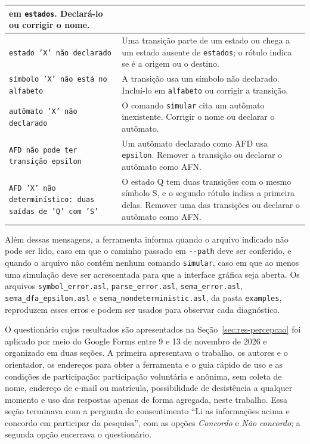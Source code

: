 \documentclass[
    12pt
    ,oneside
    ,a4paper
    ,chapter=TITLE
    ,section=TITLE
    ,sumario=abnt-6027-2012]{abntex2}
\begin{document}
\begin{quadro}[h]
\begin{tabular}{|p{}|p{}|}
        em \texttt{estados}. Declará-lo ou corrigir o nome. \\
        \hline
        \texttt{estado 'X' não declarado} & Uma transição parte de um estado ou chega a um
        estado ausente de \texttt{estados}; o rótulo indica se é a origem ou o destino. \\
        \hline
        \texttt{símbolo 'X' não está no alfabeto} & A transição usa um símbolo não
        declarado. Incluí-lo em \texttt{alfabeto} ou corrigir a transição. \\
        \hline
        \texttt{autômato 'X' não declarado} & O comando \texttt{simular} cita um autômato
        inexistente. Corrigir o nome ou declarar o autômato. \\
        \hline
        \texttt{AFD não pode ter transição epsilon} & Um autômato declarado como AFD usa
        \texttt{epsilon}. Remover a transição ou declarar o autômato como AFN. \\
        \hline
        \texttt{AFD 'X' não determinístico: duas saídas de 'Q' com 'S'} & O estado Q tem
        duas transições com o mesmo símbolo S, e o segundo rótulo indica a primeira delas.
        Remover uma das transições ou declarar o autômato como AFN. \\
        \hline
    \end{tabular}
\end{quadro}

Além dessas mensagens, a ferramenta informa quando o arquivo indicado não pode ser lido,
caso em que o caminho passado em \texttt{-{}-path} deve ser conferido, e quando o arquivo
não contém nenhum comando \texttt{simular}, caso em que ao menos uma simulação deve ser
acrescentada para que a interface gráfica seja aberta. Os arquivos
\texttt{symbol\_error.asl}, \texttt{parse\_error.asl}, \texttt{sema\_error.asl},
\texttt{sema\_dfa\_epsilon.asl} e \texttt{sema\_nondeterministic.asl}, da pasta
\texttt{examples}, reproduzem esses erros e podem ser usados para observar cada
diagnóstico.


O questionário cujos resultados são apresentados na Seção~\ref{sec:res-percepcao} foi
aplicado por meio do Google Forms entre 9 e 13 de novembro de 2026 e organizado em duas
seções. A primeira apresentava o trabalho, os autores e o orientador, os endereços para obter
a ferramenta e o guia rápido de uso e as condições de participação: participação voluntária
e anônima, sem coleta de nome, endereço de e-mail ou matrícula, possibilidade de desistência
a qualquer momento e uso das respostas apenas de forma agregada, neste trabalho. Essa seção
terminava com a pergunta de consentimento ``Li as informações acima e concordo em participar
da pesquisa'', com as opções \textit{Concordo} e \textit{Não concordo}; a segunda opção
encerrava o questionário.
\end{document}
